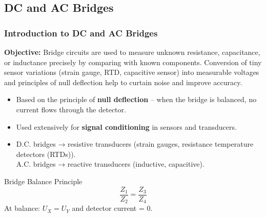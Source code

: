 \subsection{DC and AC Bridges}

\begin{frame}
	\frametitle{Introduction to DC and AC Bridges}
	\small
	\textbf{Objective:} Bridge circuits are used to measure unknown resistance, capacitance, or inductance precisely by comparing with known components.
	Conversion of tiny sensor variations (strain gauge, RTD, capacitive sensor) into measurable voltages and principles of null deflection help to curtain noise and improve accuracy.
	\begin{itemize}
		\item Based on the principle of \textbf{null deflection} -- when the bridge is balanced, no current flows through the detector.
		\item Used extensively for \textbf{signal conditioning} in sensors and transducers.
		\item D.C. bridges → resistive transducers (strain gauges, resistance temperature detectors (RTDs)).\\
			A.C. bridges → reactive transducers (inductive, capacitive).
	\end{itemize}
	\begin{block}{Bridge Balance Principle}
	\begin{equation}
		\frac{Z_1}{Z_2} = \frac{Z_3}{Z_4}
	\end{equation}
	At balance: $U_X = U_Y$ and detector current = 0.
	\end{block}
\end{frame}


